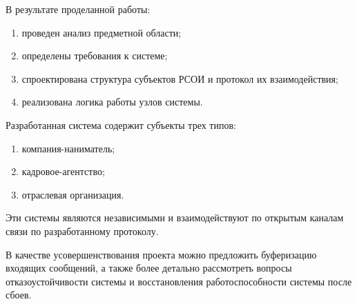 \Conclusion %
В результате проделанной работы:
\begin{enumerate}
\item проведен анализ предметной области; 
\item определены требования к системе;
\item спроектирована структура субъектов РСОИ и протокол их взаимодействия;
\item реализована логика работы узлов системы.
\end{enumerate}
Разработанная система содержит субъекты трех типов:
\begin{enumerate}
\item компания-наниматель;
\item кадровое-агентство;
\item отраслевая организация.
\end{enumerate}

Эти системы являются независимыми и взаимодействуют по открытым каналам связи по разработанному протоколу.

В качестве усовершенствования проекта можно предложить буферизацию входящих сообщений, а также более детально рассмотреть вопросы отказоустойчивости системы и восстановления работоспособности системы после сбоев.

